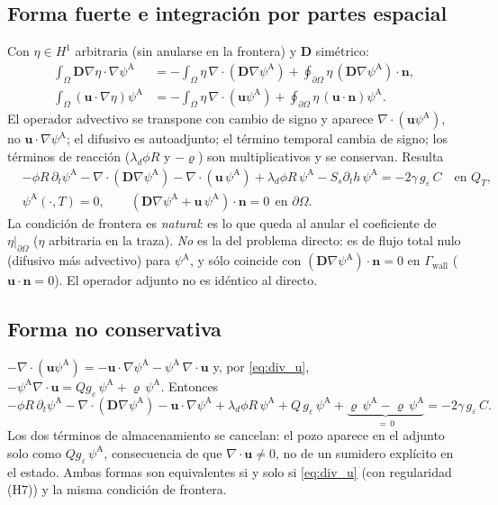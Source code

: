\documentclass[11pt]{article}
\numberwithin{equation}{section}
\theoremstyle{remark}
\newcommand{\bu}{\mathbf{u}}
\newcommand{\bD}{\mathbf{D}}
\newcommand{\bn}{\mathbf{n}}
\newcommand{\geps}{g_\varepsilon}
\newcommand{\vr}{\varrho}              %
\newcommand{\pA}{\psi^{\mathrm{A}}}    %
\newcommand{\Gwall}{\Gamma_{\mathrm{wall}}}
\begin{document}
\subsection{Forma fuerte e integraci\'on por partes espacial}
Con $\eta\in H^1$ arbitraria (sin anularse en la frontera) y $\bD$ sim\'etrico:
\begin{align*}
\int_\Omega\bD\nabla\eta\cdot\nabla\pA&=-\int_\Omega\eta\,\nabla\!\cdot(\bD\nabla\pA)+\oint_{\partial\Omega}\eta\,(\bD\nabla\pA)\cdot\bn,\\
\int_\Omega(\bu\cdot\nabla\eta)\pA&=-\int_\Omega\eta\,\nabla\!\cdot(\bu\pA)+\oint_{\partial\Omega}\eta\,(\bu\cdot\bn)\pA .
\end{align*}
El operador advectivo se transpone con cambio de signo y aparece $\nabla\!\cdot(\bu\pA)$, no $\bu\cdot\nabla\pA$; el difusivo es autoadjunto; el t\'ermino temporal cambia de signo;
los t\'erminos de reacci\'on ($\lambda_d\phi R$ y $-\vr$) son multiplicativos y se conservan. Resulta
\begin{equation}
\boxed{\begin{aligned}
&-\phi R\,\partial_t\pA-\nabla\!\cdot(\bD\nabla\pA)-\nabla\!\cdot(\bu\,\pA)+\lambda_d\phi R\,\pA-S_s\partial_th\,\pA=-2\gamma\,\geps\,C\quad\text{en }Q_T,\\
&\pA(\cdot,T)=0,\qquad(\bD\nabla\pA+\bu\,\pA)\cdot\bn=0\ \ \text{en }\partial\Omega .
\end{aligned}}
\label{eq:adj_fuerte_A}
\end{equation}
La condici\'on de frontera es \emph{natural}: es lo que queda al anular el coeficiente de $\eta|_{\partial\Omega}$ ($\eta$ arbitraria en la traza). \emph{No} es la del problema directo: es de flujo total nulo (difusivo
m\'as advectivo) para $\pA$, y s\'olo coincide con $(\bD\nabla\pA)\cdot\bn=0$ en $\Gwall$ ($\bu\cdot\bn=0$). El operador adjunto no es id\'entico al directo.

\subsection{Forma no conservativa}
$-\nabla\!\cdot(\bu\pA)=-\bu\cdot\nabla\pA-\pA\,\nabla\!\cdot\bu$ y, por \eqref{eq:div_u}, $-\pA\nabla\!\cdot\bu=Q\geps\,\pA+\vr\,\pA$. Entonces
\begin{equation}
-\phi R\,\partial_t\pA-\nabla\!\cdot(\bD\nabla\pA)-\bu\cdot\nabla\pA+\lambda_d\phi R\,\pA+Q\,\geps\,\pA+\underbrace{\vr\,\pA-\vr\,\pA}_{=\,0}=-2\gamma\,\geps\,C .
\label{eq:adj_noconservativa_A}
\end{equation}
Los dos t\'erminos de almacenamiento se cancelan: el pozo aparece en el adjunto solo como $Q\geps\,\pA$, consecuencia de que $\nabla\!\cdot\bu\neq0$, no de un sumidero expl\'icito en el estado.
Ambas formas son equivalentes si y solo si \eqref{eq:div_u} (con regularidad (H7)) y la misma condici\'on de frontera.
\end{document}
